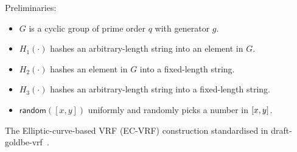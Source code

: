 \begin{algorithm}[]
    \SetAlgoLined\DontPrintSemicolon

    Preliminaries:
    \begin{itemize}
        \item $G$ is a cyclic group of prime order $q$ with generator $g$.
        \item $H_1(\cdot)$ hashes an arbitrary-length string into an element in $G$.
        \item $H_2(\cdot)$ hashes an element in $G$ into a fixed-length string.
        \item $H_3(\cdot)$ hashes an arbitrary-length string into a fixed-length string.
        \item $\mathsf{random}([x, y])$ uniformly and randomly picks a number in $\interval{x}{y}$.
    \end{itemize}





    \label{algo:standard-ecvrf}
    \caption{The Elliptic-curve-based VRF (EC-VRF) construction standardised in draft-goldbe-vrf~\cite{goldberg2017draft}.}
\end{algorithm}
